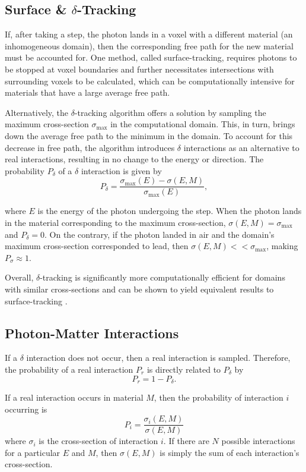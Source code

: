 \subsection{Surface \& $\delta$-Tracking}\label{ssec:delta_tracking}

\par If, after taking a step, the photon lands in a voxel with a different material (an inhomogeneous domain), then the corresponding free path for the new material must be accounted for. One method, called surface-tracking, requires photons to be stopped at voxel boundaries and further necessitates intersections with surrounding voxels to be calculated, which can be computationally intensive for materials that have a large average free path. 
\par Alternatively, the $\delta$-tracking algorithm offers a solution by sampling the maximum cross-section $\sigma_{\text{max}}$ in the computational domain. This, in turn, brings down the average free path to the minimum in the domain. To account for this decrease in free path, the algorithm introduces $\delta$ interactions as an alternative to real interactions, resulting in no change to the energy or direction. The probability $P_{\delta}$ of a $\delta$ interaction is given by 
\begin{equation}
    P_{\delta} = \frac{\sigma_{\text{max}}(E) - \sigma(E, M)}{\sigma_{\text{max}}(E)},
\end{equation}

where $E$ is the energy of the photon undergoing the step. When the photon lands in the material corresponding to the maximum cross-section, $\sigma(E, M) = \sigma_{\text{max}}$ and $P_{\delta} = 0$. On the contrary, if the photon landed in air and the domain's maximum cross-section corresponded to lead, then $\sigma(E, M) << \sigma_{\text{max}}$, making $P_{\sigma} \approx 1$.

\par Overall, $\delta$-tracking is significantly more computationally efficient for domains with similar cross-sections and can be shown to yield equivalent results to surface-tracking \cite{vassiliev_monte_2017}.

\subsection{Photon-Matter Interactions}
\par If a $\delta$ interaction does not occur, then a real interaction is sampled. Therefore, the probability of a real interaction $P_r$ is directly related to $P_\delta$ by
\begin{equation}
    P_r = 1 - P_\delta.
\end{equation}
\par If a real interaction occurs in material $M$, then the probability of interaction $i$ occurring is 
\begin{equation}
P_i = \frac{\sigma_i(E, M)}{\sigma (E, M)}
\end{equation}
where $\sigma_i$ is the cross-section of interaction $i$. If there are $N$ possible interactions for a particular $E$ and $M$, then $\sigma (E, M)$ is simply the sum of each interaction's cross-section.


